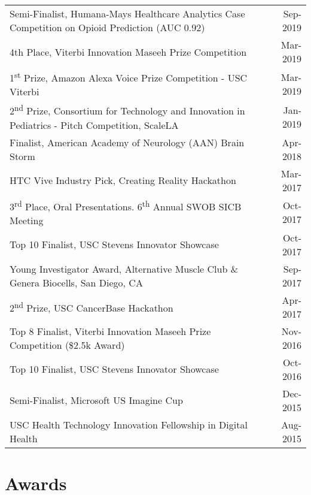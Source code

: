 \documentclass[10pt,a4paper]{article}
\newcommand{\ts}{\textsuperscript}
\begin{document}
  \vspace*{1mm}\noindent\begin{tabularx}{17cm}{X r}
    Semi-Finalist, Humana-Mays Healthcare Analytics Case Competition on Opioid Prediction (AUC 0.92) & Sep-2019 \\
    4th Place, Viterbi Innovation Maseeh Prize Competition & Mar-2019 \\ %
    1\ts{st} Prize, Amazon Alexa Voice Prize Competition - USC Viterbi & Mar-2019 \\ %
    2\ts{nd} Prize, Consortium for Technology and Innovation in Pediatrics - Pitch Competition, ScaleLA & Jan-2019\\ 
    Finalist, American Academy of Neurology (AAN) Brain Storm & Apr-2018 \\%
    HTC Vive Industry Pick, Creating Reality Hackathon & Mar-2017 \\%
    3\ts{rd} Place, Oral Presentations. 6\ts{th} Annual SWOB SICB Meeting & Oct-2017\\ %
    Top 10 Finalist, USC Stevens Innovator Showcase & Oct-2017 \\%
    Young Investigator Award, Alternative Muscle Club \& Genera Biocells, San Diego, CA & Sep-2017\\ %
    2\ts{nd} Prize, USC CancerBase Hackathon & Apr-2017 \\ %
    Top 8 Finalist, Viterbi Innovation Maseeh Prize Competition (\$2.5k Award) & Nov-2016 \\ %
    Top 10 Finalist, USC Stevens Innovator Showcase & Oct-2016 \\ %
    Semi-Finalist, Microsoft US Imagine Cup & Dec-2015 \\
    USC Health Technology Innovation Fellowship in Digital Health & Aug-2015\\

  \end{tabularx}

\vspace*{2mm}\section*{Awards}
  
\end{document}
